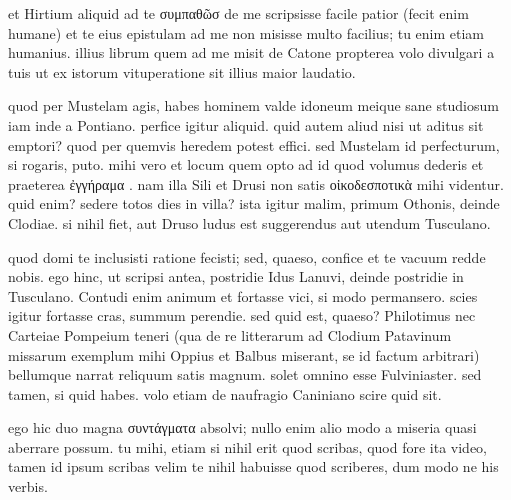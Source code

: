 


 et Hirtium aliquid ad te συμπαθῶσ de me scripsisse facile patior (fecit enim humane) et te eius epistulam ad me non misisse multo facilius; tu enim etiam humanius. illius librum quem ad me misit de Catone propterea volo divulgari a tuis ut ex istorum vituperatione sit illius maior laudatio.

 quod per Mustelam agis, habes hominem valde idoneum meique sane studiosum iam inde a Pontiano. perfice igitur aliquid. quid autem aliud nisi ut aditus sit emptori? quod per quemvis heredem potest effici. sed Mustelam id perfecturum, si rogaris, puto. mihi vero et locum quem opto ad id quod volumus dederis et praeterea ἐγγήραμα . nam illa Sili et Drusi non satis οἰκοδεσποτικὰ mihi videntur. quid enim? sedere totos dies in villa? ista igitur malim, primum Othonis, deinde Clodiae. si nihil fiet, aut Druso ludus est suggerendus aut utendum Tusculano.

 quod domi te inclusisti ratione fecisti; sed, quaeso, confice et te vacuum redde nobis. ego hinc, ut scripsi antea, postridie Idus Lanuvi, deinde postridie in Tusculano. Contudi enim animum et fortasse vici, si modo permansero. scies igitur fortasse cras, summum perendie. sed quid est, quaeso? Philotimus nec Carteiae Pompeium teneri (qua de re litterarum ad Clodium Patavinum missarum exemplum mihi Oppius et Balbus miserant, se id factum arbitrari) bellumque narrat reliquum satis magnum. solet omnino esse Fulviniaster. sed tamen, si quid habes. volo etiam de naufragio Caniniano scire quid sit.

 ego hic duo magna συντάγματα absolvi; nullo enim alio modo a miseria quasi aberrare possum. tu mihi, etiam si nihil erit quod scribas, quod fore ita video, tamen id ipsum scribas velim te nihil habuisse quod scriberes, dum modo ne his verbis.
